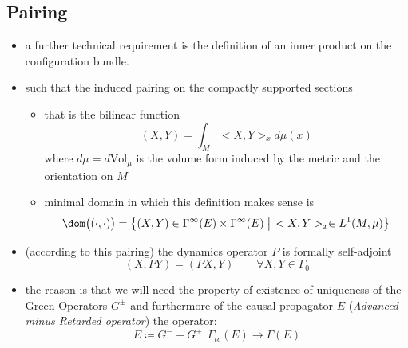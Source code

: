 \documentclass[a4paper,11pt]{scrartcl}
\begin{document}
    \subsection{Pairing}
    \begin{itemize}
        \item a further technical requirement is the definition of an inner product on the configuration bundle.
        \item such that the induced pairing on the compactly supported sections
        \begin{itemize}
            \item         that is the bilinear function
            $$ (X,Y) = \int_M <X,Y>_x d\mu(x)$$
               where $d\mu = d\textrm{Vol}_\mu$ is the volume form induced by the metric and the orientation on $M$
            \item minimal domain in which this definition makes sense is
            $$ \dom\big( (\cdot, \cdot) \big) =
                       \big\{(X,Y) \in \Gamma^\infty(E) \times \Gamma^\infty(E) \; \big\vert \,  <X,Y>_x \in L^1(M,\mu)\big \} $$
        \end{itemize}
        \item (according to this pairing) the dynamics operator $P$  is formally self-adjoint
        $$(X,PY) = (PX,Y) \qquad \forall X,Y \in \Gamma_0$$
        \item the reason is that we will need the property of existence of uniqueness of the Green Operators $G^\pm$ and furthermore of the  causal propagator $E$ (\emph{Advanced minus Retarded operator}) the operator:
                $$
                    E \coloneqq G^-  - G^+ : \Gamma_{tc}(E) \rightarrow \Gamma(E)
                $$
    \end{itemize}
        

    
\end{document}

